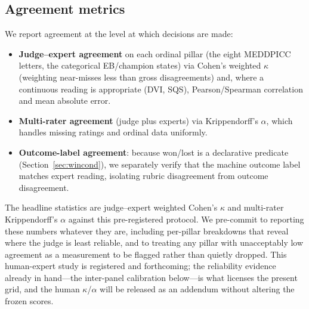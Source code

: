 \subsection{Agreement metrics}
We report agreement at the level at which decisions are made:

\begin{itemize}[leftmargin=1.4em,itemsep=2pt,topsep=2pt]
  \sloppy
  \item \textbf{Judge--expert agreement} on each ordinal pillar (the eight
  MEDDPICC letters, the categorical EB/champion states) via Cohen's weighted
  $\kappa$ (weighting near-misses less than gross disagreements) and, where a
  continuous reading is appropriate (DVI, SQS), Pearson/Spearman correlation and
  mean absolute error.
  \item \textbf{Multi-rater agreement} (judge plus experts) via Krippendorff's
  $\alpha$, which handles missing ratings and ordinal data uniformly.
  \item \textbf{Outcome-label agreement}: because won/lost is a declarative
  predicate (Section~\ref{sec:wincond}), we separately verify that the machine
  outcome label matches expert reading, isolating rubric disagreement from
  outcome disagreement.
\end{itemize}

The headline statistics are judge--expert weighted Cohen's $\kappa$ and multi-rater
Krippendorff's $\alpha$ against this pre-registered protocol. We pre-commit to
reporting these numbers whatever they are, including per-pillar breakdowns that
reveal where the judge is least reliable, and to treating any pillar with
unacceptably low agreement as a measurement to be flagged rather than quietly
dropped. This human-expert study is registered and forthcoming; the reliability
evidence already in hand---the inter-panel calibration below---is what licenses the
present grid, and the human $\kappa$/$\alpha$ will be released as an addendum
without altering the frozen scores.

